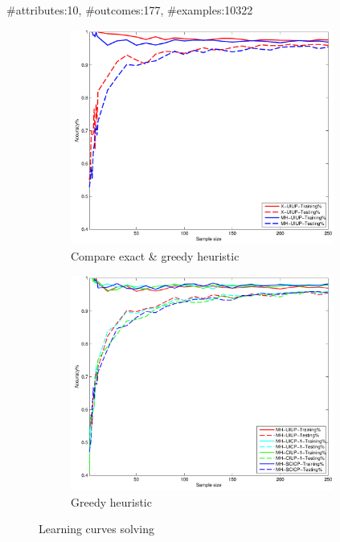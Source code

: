 {
	\begin{center}
		\#attributes:10, \#outcomes:177, \#examples:10322
	\end{center}

  \begin{figure}
    \centering
    \begin{subfigure}[b]{0.48\textwidth}
      \centering
      \includegraphics[width=0.95\textwidth]{figs/PrefLearnResults/MatLabOutput/Wine_Trees_X_MH.pdf}
      \caption{Compare exact \& greedy heuristic}
    \end{subfigure}
    \begin{subfigure}[b]{0.48\textwidth}
      \centering
      \includegraphics[width=0.95\textwidth]{figs/PrefLearnResults/MatLabOutput/Wine_Trees_MH.pdf}
      \caption{Greedy heuristic}
    \end{subfigure}

    \caption{Learning curves solving }
  \end{figure}
}

